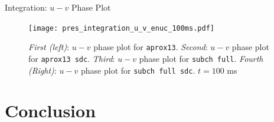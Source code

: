 \documentclass[
	11pt, %
]{beamer}
\begin{document}


\begin{frame}{Integration: $u-v$ Phase Plot}
    \begin{figure}
        \centering
        \texttt{[image: pres\_integration\_u\_v\_enuc\_100ms.pdf]}
        \caption{\scriptsize {\it First (left)}: $u-v$ phase plot for {\tt aprox13}. {\it Second}: $u-v$ phase plot for {\tt aprox13 sdc}. {\it Third}: $u-v$ phase plot for {\tt subch full}. {\it Fourth (Right)}: $u-v$ phase plot for {\tt subch full sdc}. $t = 100$ ms}
    \end{figure}
\end{frame}

\section{Conclusion}
\end{document}
